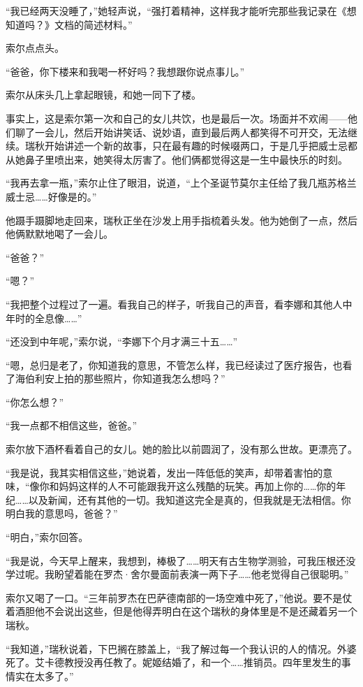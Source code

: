 \documentclass[AutoFakeBold=true]{book}
\begin{document}
``我已经两天没睡了，''她轻声说，``强打着精神，这样我才能听完那些我记录在《想知道吗？》文档的简述材料。''

索尔点点头。

``爸爸，你下楼来和我喝一杯好吗？我想跟你说点事儿。''

索尔从床头几上拿起眼镜，和她一同下了楼。

事实上，这是索尔第一次和自己的女儿共饮，也是最后一次。场面并不欢闹——他们聊了一会儿，然后开始讲笑话、说妙语，直到最后两人都笑得不可开交，无法继续。瑞秋开始讲述一个新的故事，只在最有趣的时候啜两口，于是几乎把威士忌都从她鼻子里喷出来，她笑得太厉害了。他们俩都觉得这是一生中最快乐的时刻。

``我再去拿一瓶，''索尔止住了眼泪，说道，``上个圣诞节莫尔主任给了我几瓶苏格兰威士忌……好像是的。''

他蹑手蹑脚地走回来，瑞秋正坐在沙发上用手指梳着头发。他为她倒了一点，然后他俩默默地喝了一会儿。

``爸爸？''

``嗯？''

``我把整个过程过了一遍。看我自己的样子，听我自己的声音，看李娜和其他人中年时的全息像……''

``还没到中年呢，''索尔说，``李娜下个月才满三十五……''

``嗯，总归是老了，你知道我的意思，不管怎么样，我已经读过了医疗报告，也看了海伯利安上拍的那些照片，你知道我怎么想吗？''

``你怎么想？''

``我一点都不相信这些，爸爸。''

索尔放下酒杯看着自己的女儿。她的脸比以前圆润了，没有那么世故。更漂亮了。

``我是说，我其实相信这些，''她说着，发出一阵低低的笑声，却带着害怕的意味，``像你和妈妈这样的人不可能跟我开这么残酷的玩笑。再加上你的……你的年纪……以及新闻，还有其他的一切。我知道这完全是真的，但我就是无法相信。你明白我的意思吗，爸爸？''

``明白，''索尔回答。

``我是说，今天早上醒来，我想到，棒极了……明天有古生物学测验，可我压根还没学过呢。我盼望着能在罗杰·舍尔曼面前表演一两下子……他老觉得自己很聪明。''

索尔又喝了一口。``三年前罗杰在巴萨德南部的一场空难中死了，''他说。要不是仗着酒胆他不会说出这些，但是他得弄明白在这个瑞秋的身体里是不是还藏着另一个瑞秋。

``我知道，''瑞秋说着，下巴搁在膝盖上，``我了解过每一个我认识的人的情况。外婆死了。艾卡德教授没再任教了。妮姬结婚了，和一个……推销员。四年里发生的事情实在太多了。''
\end{document}
